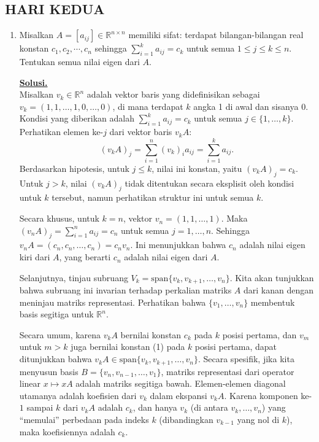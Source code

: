 \documentclass[12pt,twoside]{article}
\newenvironment{solution}
{
	\par\noindent\textbf{\underline{Solusi.}}\\
}
{
	\par
}
\begin{document}
\subsection{HARI KEDUA}
\begin{enumerate}
  \item Misalkan $A=[a_{ij}]\in \mathbb{R}^{n\times n}$ memiliki sifat: terdapat bilangan-bilangan real konstan $c_1,c_2,\cdots,c_n$ sehingga $\sum_{i=1}^k a_{ij}=c_k$ untuk semua $1\leq j\leq k\leq n$. Tentukan semua nilai eigen dari $A$.
        \begin{solution}
          Misalkan $v_k \in \mathbb{R}^n$ adalah vektor baris yang didefinisikan sebagai $v_k = (1, 1, \dots, 1, 0, \dots, 0)$, di mana terdapat $k$ angka 1 di awal dan sisanya 0.
          Kondisi yang diberikan adalah $\sum_{i=1}^k a_{ij} = c_k$ untuk semua $j \in \{1, \dots, k\}$.
          Perhatikan elemen ke-$j$ dari vektor baris $v_k A$:
          \[ (v_k A)_j = \sum_{i=1}^n (v_k)_i a_{ij} = \sum_{i=1}^k a_{ij}. \]
          Berdasarkan hipotesis, untuk $j \le k$, nilai ini konstan, yaitu $(v_k A)_j = c_k$.
          Untuk $j > k$, nilai $(v_k A)_j$ tidak ditentukan secara eksplisit oleh kondisi untuk $k$ tersebut, namun perhatikan struktur ini untuk semua $k$.

          Secara khusus, untuk $k=n$, vektor $v_n = (1, 1, \dots, 1)$.
          Maka $(v_n A)_j = \sum_{i=1}^n a_{ij} = c_n$ untuk semua $j=1, \dots, n$.
          Sehingga $v_n A = (c_n, c_n, \dots, c_n) = c_n v_n$.
          Ini menunjukkan bahwa $c_n$ adalah nilai eigen kiri dari $A$, yang berarti $c_n$ adalah nilai eigen dari $A$.

          Selanjutnya, tinjau subruang $V_k = \text{span}\{v_k, v_{k+1}, \dots, v_n\}$.
          Kita akan tunjukkan bahwa subruang ini invarian terhadap perkalian matriks $A$ dari kanan dengan meninjau matriks representasi.
          Perhatikan bahwa $\{v_1, \dots, v_n\}$ membentuk basis segitiga untuk $\mathbb{R}^n$.

          Secara umum, karena $v_k A$ bernilai konstan $c_k$ pada $k$ posisi pertama, dan $v_m$ untuk $m > k$ juga bernilai konstan (1) pada $k$ posisi pertama,
          dapat ditunjukkan bahwa $v_k A \in \text{span}\{v_k, v_{k+1}, \dots, v_n\}$.
          Secara spesifik, jika kita menyusun basis $B = \{v_n, v_{n-1}, \dots, v_1\}$, matriks representasi dari operator linear $x \mapsto xA$ adalah matriks segitiga bawah.
          Elemen-elemen diagonal utamanya adalah koefisien dari $v_k$ dalam ekspansi $v_k A$.
          Karena komponen ke-$1$ sampai $k$ dari $v_k A$ adalah $c_k$, dan hanya $v_k$ (di antara $v_k, \dots, v_n$) yang ``memulai'' perbedaan pada indeks $k$ (dibandingkan $v_{k-1}$ yang nol di $k$), maka koefisiennya adalah $c_k$.


\end{solution}
\end{enumerate}
\end{document}
